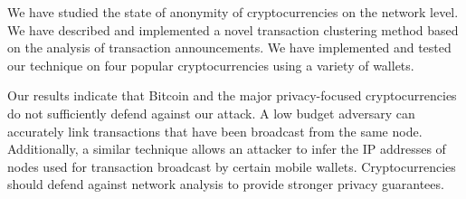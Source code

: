 We have studied the state of anonymity of cryptocurrencies on the network level.
We have described and implemented a novel transaction clustering method based on the analysis of transaction announcements.
We have implemented and tested our technique on four popular cryptocurrencies using a variety of wallets.

Our results indicate that Bitcoin and the major privacy-focused cryptocurrencies do not sufficiently defend against our attack.
A low budget adversary can accurately link transactions that have been broadcast from the same node.
Additionally, a similar technique allows an attacker to infer the IP addresses of nodes used for transaction broadcast by certain mobile wallets.
Cryptocurrencies should defend against network analysis to provide stronger privacy guarantees.
